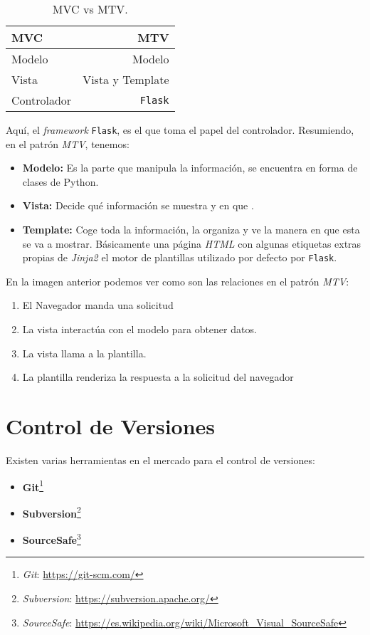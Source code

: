 \begin{table}[!h]
\centering
\begin{tabular}{lr}
\toprule
\textbf{MVC}& \multicolumn{1}{r}{\textbf{MTV}} \\ 
\midrule
Modelo & Modelo\\
Vista & Vista y Template\\
Controlador & \texttt{Flask} \\ 
\bottomrule
\end{tabular}
\caption{MVC vs MTV.}
\label{stats}
\end{table}


Aquí, el \emph{framework} \texttt{Flask}, es el que toma el papel del controlador.
Resumiendo, en el patrón \emph{MTV}, tenemos:
\begin{itemize}
\item\textbf{Modelo:} Es la parte que manipula la información, se encuentra en forma de clases de Python.
\item\textbf{Vista:} Decide qué información se muestra y en que .
\item\textbf{Template:} Coge toda la información, la organiza y ve la manera en que esta se va a mostrar. Básicamente una página \emph{HTML} con algunas etiquetas extras propias de \emph{Jinja2} el motor de plantillas utilizado por defecto por \texttt{Flask}.
\end{itemize}


En la imagen anterior podemos ver como son las relaciones en el patrón \emph{MTV}:
\begin{enumerate}
\item El Navegador manda una solicitud 
\item La vista interactúa con el modelo para obtener datos. 
\item La vista llama a la plantilla. 
\item La plantilla renderiza la respuesta a la solicitud del navegador 
\end{enumerate}

\section{Control de Versiones}

Existen varias herramientas en el mercado para el control de versiones:
\begin{itemize}
\item\textbf{Git}\footnote{\textsl{Git}: \url{https://git-scm.com/}}
\item \textbf{Subversion}\footnote{\textsl{Subversion}: \url{https://subversion.apache.org/}}
\item \textbf{SourceSafe}\footnote{\textsl{SourceSafe}: \url{https://es.wikipedia.org/wiki/Microsoft_Visual_SourceSafe}}
\end{itemize}

